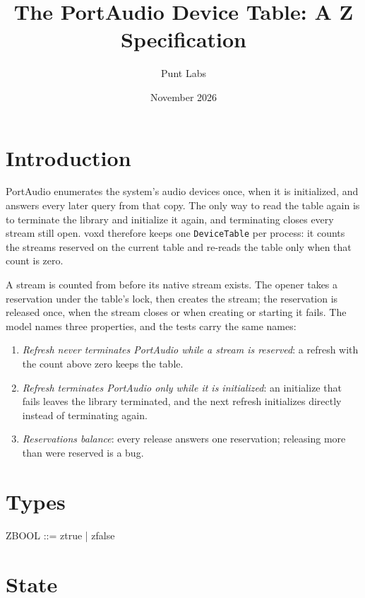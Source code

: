 \documentclass[a4paper,10pt,fleqn]{article}
\begin{document}
\title{The PortAudio Device Table: A Z Specification}
\author{Punt Labs}
\date{November 2026}
\maketitle

\section{Introduction}

PortAudio enumerates the system's audio devices once, when it is
initialized, and answers every later query from that copy. The only way to
read the table again is to terminate the library and initialize it again,
and terminating closes every stream still open. voxd therefore keeps one
\texttt{DeviceTable} per process: it counts the streams reserved on the
current table and re-reads the table only when that count is zero.

A stream is counted from before its native stream exists. The opener takes
a reservation under the table's lock, then creates the stream; the
reservation is released once, when the stream closes or when creating or
starting it fails. The model names three properties, and the tests carry
the same names:

\begin{enumerate}
  \item[P1] \emph{Refresh never terminates PortAudio while a stream is
    reserved}: a refresh with the count above zero keeps the table.
  \item[P2] \emph{Refresh terminates PortAudio only while it is
    initialized}: an initialize that fails leaves the library terminated,
    and the next refresh initializes directly instead of terminating again.
  \item[P3] \emph{Reservations balance}: every release answers one
    reservation; releasing more than were reserved is a bug.
\end{enumerate}

\section{Types}

\begin{zed}
  ZBOOL ::= ztrue | zfalse
\end{zed}

\section{State}
\end{document}
